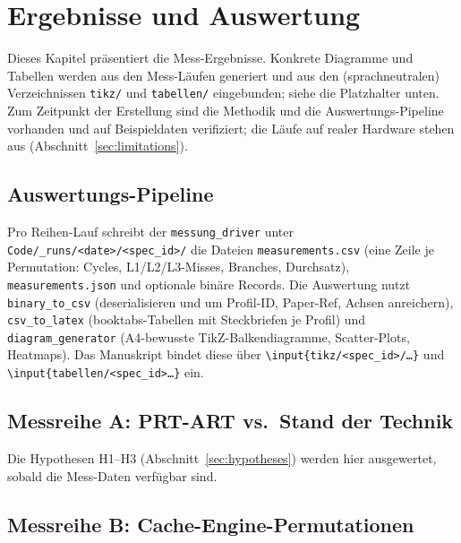 \chapter{Ergebnisse und Auswertung}\label{ch:results}

Dieses Kapitel präsentiert die Mess-Ergebnisse. Konkrete Diagramme und Tabellen werden aus den
Mess-Läufen generiert und aus den (sprachneutralen) Verzeichnissen \texttt{tikz/} und
\texttt{tabellen/} eingebunden; siehe die Platzhalter unten. Zum Zeitpunkt der Erstellung sind
die Methodik und die Auswertungs-Pipeline vorhanden und auf Beispieldaten verifiziert; die
Läufe auf realer Hardware stehen aus (Abschnitt~\ref{sec:limitations}).

\section{Auswertungs-Pipeline}\label{sec:eval-pipeline}

Pro Reihen-Lauf schreibt der \texttt{messung\_driver} unter
\texttt{Code/\_runs/<date>/<spec\_id>/} die Dateien \texttt{measurements.csv} (eine Zeile je
Permutation: Cycles, L1/L2/L3-Misses, Branches, Durchsatz), \texttt{measurements.json} und
optionale binäre Records. Die Auswertung nutzt \texttt{binary\_to\_csv} (deserialisieren und um
Profil-ID, Paper-Ref, Achsen anreichern), \texttt{csv\_to\_latex} (booktabs-Tabellen mit
Steckbriefen je Profil) und \texttt{diagram\_generator} (A4-bewusste TikZ-Balkendiagramme,
Scatter-Plots, Heatmaps). Das Manuskript bindet diese über
\texttt{\textbackslash input\{tikz/<spec\_id>/\ldots\}} und
\texttt{\textbackslash input\{tabellen/<spec\_id>\ldots\}} ein.

\section{Messreihe A: PRT-ART vs.\ Stand der Technik}\label{sec:result-a}

%   
%   
Die Hypothesen H1--H3 (Abschnitt~\ref{sec:hypotheses}) werden hier ausgewertet, sobald die
Mess-Daten verfügbar sind.

\section{Messreihe B: Cache-Engine-Permutationen}\label{sec:result-b}

% 

